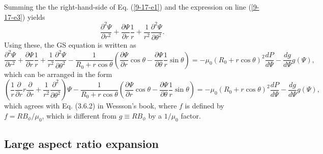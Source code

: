 \documentclass{llncs}
\begin{document}
Summing the the right-hand-side of Eq. (\ref{9-17-e1}) and the expression on
line (\ref{9-17-e3}) yields
\begin{equation}
  \frac{\partial^2 \Psi}{\partial r^2} + \frac{\partial \Psi}{\partial r} 
  \frac{1}{r} + \frac{1}{r^2} \frac{\partial^2 \Psi}{\partial \theta^2} .
\end{equation}
Using these, the GS equation is written as
\[ \frac{\partial^2 \Psi}{\partial r^2} + \frac{\partial \Psi}{\partial r} 
   \frac{1}{r} + \frac{1}{r^2} \frac{\partial^2 \Psi}{\partial \theta^2} -
   \frac{1}{R_0 + r \cos \theta} \left( \frac{\partial \Psi}{\partial r} \cos
   \theta - \frac{\partial \Psi}{\partial \theta}  \frac{1}{r} \sin \theta
   \right) = - \mu_0 (R_0 + r \cos \theta)^2 \frac{d P}{d \Psi} - \frac{d g}{d
   \Psi} g (\Psi), \]
which can be arranged in the form
\begin{equation}
  \label{9-17-e5} \left( \frac{1}{r}  \frac{\partial}{\partial r} r
  \frac{\partial}{\partial r} + \frac{1}{r^2}  \frac{\partial^2}{\partial
  \theta^2} \right) \Psi - \frac{1}{R_0 + r \cos \theta} \left( \frac{\partial
  \Psi}{\partial r} \cos \theta - \frac{\partial \Psi}{\partial \theta} 
  \frac{1}{r} \sin \theta \right) = - \mu_0 (R_0 + r \cos \theta)^2 \frac{d
  P}{d \Psi} - \frac{d g}{d \Psi} g (\Psi),
\end{equation}
which agrees with Eq. (3.6.2) in Wessson's book{\cite{wesson2004}}, where $f$
is defined by $f = R B_{\phi} / \mu_0$, which is different from $g \equiv R
B_{\phi}$ by a $1 / \mu_0$ factor.

\subsection{Large aspect ratio expansion}
\end{document}
